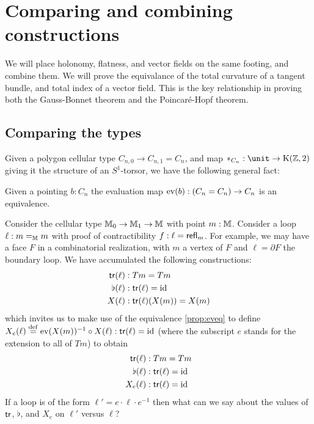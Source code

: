\section{Comparing and combining constructions}
We will place holonomy, flatness, and vector fields on the same footing, and combine them. We will prove the equivalance of the total curvature of a tangent bundle, and total index of a vector field. This is the key relationship in proving both the Gauss-Bonnet theorem and the Poincaré-Hopf theorem.

\subsection{Comparing the types}
Given a polygon cellular type \( C_{n,0}\to C_{n,1}=C_n \), and map \( *_{C_n}:\unit\to\Kzt \) giving it the structure of an \( S^1 \)-torsor, we have the following general fact:
\begin{myprop}
\label{prop:eveq}
Given a pointing \( b:C_n \) the evaluation map \( \mathrm{ev}(b):(C_n=C_n)\to C_n \) is an equivalence.
\end{myprop}

Consider the cellular type \( \mathbb{M}_0\to\mathbb{M}_1\to\mathbb{M} \) with point \( m:\mathbb{M} \). Consider a loop \( \ell:m=_{\mathbb{M}} m \) with proof of contractibility \( f:\ell=\mathsf{refl}_m \). For example, we may have a face \( F \) in a combinatorial realization, with \( m \) a vertex of \( F \) and \( \ell=\partial F \) the boundary loop. We have accumulated the following constructions:
\[\begin{aligned}
\mathsf{tr}(\ell)&:Tm=Tm\\
\flat(\ell)&:\mathsf{tr}(\ell)=\text{id}\\
X(\ell)&:\mathsf{tr}(\ell)(X(m))=X(m)\\
\end{aligned}\]
which invites us to make use of the equivalence \ref{prop:eveq} to define \( X_e(\ell)\stackrel{\mathrm{def}}{=} \mathrm{ev}(X(m))^{-1}\circ X(\ell):\mathsf{tr}(\ell)=\text{id} \) (where the subscript \( e \) stands for the extension to all of \( Tm \)) to obtain
\[\begin{aligned}
\mathsf{tr}(\ell)&:Tm=Tm\\
\flat(\ell)&:\mathsf{tr}(\ell)=\text{id}\\
X_e(\ell)&:\mathsf{tr}(\ell)=\text{id}\\
\end{aligned}\]
If a loop is of the form \( \ell'=e\cdot \ell\cdot e^{-1} \) then what can we say about the values of \( \mathsf{tr} \), \( \flat \), and \( X_e \) on \( \ell' \) versus \( \ell \)?

